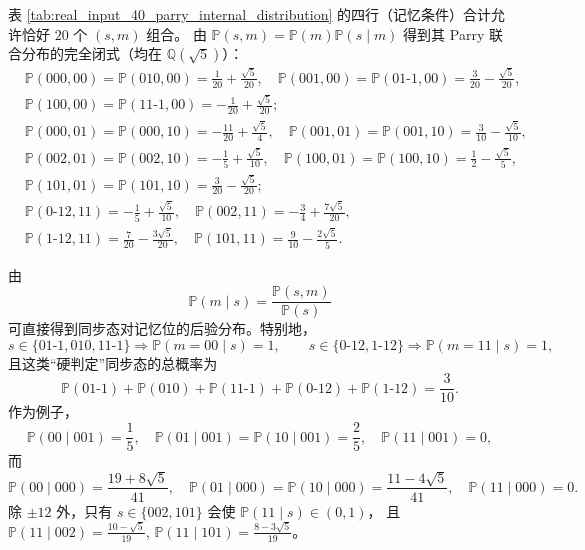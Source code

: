 \begin{remark}[本质 $20$ 状态核的全联合分布]\label{rem:real-input-40-parry-essential-20-joint}
表 \ref{tab:real_input_40_parry_internal_distribution} 的四行（记忆条件）合计允许恰好 $20$ 个 $(s,m)$ 组合。
由 $\mathbb{P}(s,m)=\mathbb{P}(m)\mathbb{P}(s\mid m)$ 得到其 Parry 联合分布的完全闭式（均在 $\mathbb{Q}(\sqrt5)$）：
\[
\begin{aligned}
&\mathbb{P}(000,00)=\mathbb{P}(010,00)=\frac{1}{20}+\frac{\sqrt5}{20},\quad
\mathbb{P}(001,00)=\mathbb{P}(01\text{-}1,00)=\frac{3}{20}-\frac{\sqrt5}{20},\\
&\mathbb{P}(100,00)=\mathbb{P}(11\text{-}1,00)=-\frac{1}{20}+\frac{\sqrt5}{20};\\[2pt]
&\mathbb{P}(000,01)=\mathbb{P}(000,10)=-\frac{11}{20}+\frac{\sqrt5}{4},\quad
\mathbb{P}(001,01)=\mathbb{P}(001,10)=\frac{3}{10}-\frac{\sqrt5}{10},\\
&\mathbb{P}(002,01)=\mathbb{P}(002,10)=-\frac15+\frac{\sqrt5}{10},\quad
\mathbb{P}(100,01)=\mathbb{P}(100,10)=\frac12-\frac{\sqrt5}{5},\\
&\mathbb{P}(101,01)=\mathbb{P}(101,10)=\frac{3}{20}-\frac{\sqrt5}{20};\\[2pt]
&\mathbb{P}(0\text{-}12,11)=-\frac15+\frac{\sqrt5}{10},\quad
\mathbb{P}(002,11)=-\frac34+\frac{7\sqrt5}{20},\\
&\mathbb{P}(1\text{-}12,11)=\frac7{20}-\frac{3\sqrt5}{20},\quad
\mathbb{P}(101,11)=\frac9{10}-\frac{2\sqrt5}{5}.
\end{aligned}
\]
\end{remark}

\begin{remark}\label{rem:real-input-40-bayes-decode}
由
\[
\mathbb{P}(m\mid s)=\frac{\mathbb{P}(s,m)}{\mathbb{P}(s)}
\]
可直接得到同步态对记忆位的后验分布。特别地，
\[
s\in\{01\text{-}1,010,11\text{-}1\}\Rightarrow \mathbb{P}(m=00\mid s)=1,
\qquad
s\in\{0\text{-}12,1\text{-}12\}\Rightarrow \mathbb{P}(m=11\mid s)=1,
\]
且这类“硬判定”同步态的总概率为
\[
\mathbb{P}(01\text{-}1)+\mathbb{P}(010)+\mathbb{P}(11\text{-}1)+\mathbb{P}(0\text{-}12)+\mathbb{P}(1\text{-}12)=\frac{3}{10}.
\]
作为例子，
\[
\mathbb{P}(00\mid 001)=\frac15,\quad
\mathbb{P}(01\mid 001)=\mathbb{P}(10\mid 001)=\frac25,\quad
\mathbb{P}(11\mid 001)=0,
\]
而
\[
\mathbb{P}(00\mid 000)=\frac{19+8\sqrt5}{41},\quad
\mathbb{P}(01\mid 000)=\mathbb{P}(10\mid 000)=\frac{11-4\sqrt5}{41},\quad
\mathbb{P}(11\mid 000)=0.
\]
除 $\pm12$ 外，只有 $s\in\{002,101\}$ 会使 $\mathbb{P}(11\mid s)\in(0,1)$，
且
\(
\mathbb{P}(11\mid 002)=\frac{10-\sqrt5}{19}
\),
\(
\mathbb{P}(11\mid 101)=\frac{8-3\sqrt5}{19}
\)。
\end{remark}

